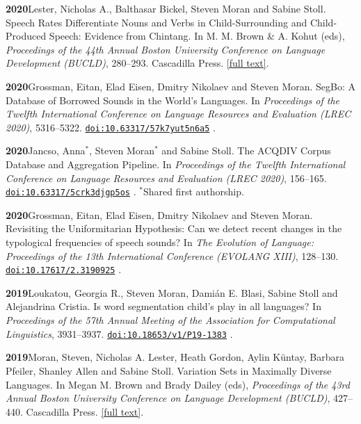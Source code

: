 \documentclass[11pt]{article}
\newcommand{\hangpara}{
 \setlength{\parindent}{0in} %
 \hangindent=0.42in %
}
\newcommand{\doi}[1]{%
  \href{https://doi.org/#1}{\nolinkurl{doi:#1}}%
}
\begin{document}
\vskip 6pt
\hangpara
{\bf 2020}\hspace{1ex}Lester, Nicholas A., Balthasar Bickel, Steven Moran and Sabine Stoll. Speech Rates Differentiate Nouns and Verbs in Child-Surrounding and Child-Produced Speech: Evidence from Chintang. In M. M. Brown \& A. Kohut (eds), {\it Proceedings of the 44th Annual Boston University Conference on Language Development (BUCLD)}, 280--293. Cascadilla Press. \href{http://www.lingref.com/bucld/44/BUCLD44-23.pdf}{[full text]}.

\vskip 6pt
\hangpara
{\bf 2020}\hspace{1ex}Grossman, Eitan, Elad Eisen, Dmitry Nikolaev and Steven Moran. SegBo: A Database of Borrowed Sounds in the World's Languages. In {\it Proceedings of the Twelfth International Conference on Language Resources and Evaluation (LREC 2020)}, 5316--5322. \doi{10.63317/57k7yut5n6a5}.

\vskip 6pt
\hangpara
{\bf 2020}\hspace{1ex}Jancso, Anna$^*$, Steven Moran$^*$ and Sabine Stoll. The ACQDIV Corpus Database and Aggregation Pipeline. In {\it Proceedings of the Twelfth International Conference on Language Resources and Evaluation (LREC 2020)}, 156--165. \doi{10.63317/5crk3djgp5os}. $^{*}$Shared first authorship.

\vskip 6pt
\hangpara
{\bf 2020}\hspace{1ex}Grossman, Eitan, Elad Eisen, Dmitry Nikolaev and Steven Moran. Revisiting the Uniformitarian Hypothesis: Can we detect recent changes in the typological frequencies of speech sounds? In {\it The Evolution of Language: Proceedings of the 13th International Conference (EVOLANG XIII)}, 128--130. \doi{10.17617/2.3190925}.

\vskip 6pt
\hangpara
{\bf 2019}\hspace{1ex}Loukatou, Georgia R., Steven Moran, Dami{\'a}n E. Blasi, Sabine Stoll and Alejandrina Cristia. Is word segmentation child's play in all languages? In {\it Proceedings of the 57th Annual Meeting of the Association for Computational Linguistics}, 3931--3937. \doi{10.18653/v1/P19-1383}.

\vskip 6pt
\hangpara
{\bf 2019}\hspace{1ex}Moran, Steven, Nicholas A. Lester, Heath Gordon, Aylin Küntay, Barbara Pfeiler, Shanley Allen and Sabine Stoll. Variation Sets in Maximally Diverse Languages. In Megan M. Brown and Brady Dailey (eds), {\it Proceedings of the 43rd Annual Boston University Conference on Language Development (BUCLD)}, 427--440. Cascadilla Press. \href{http://www.lingref.com/bucld/43/BUCLD43-34.pdf}{[full text]}.
\end{document}
